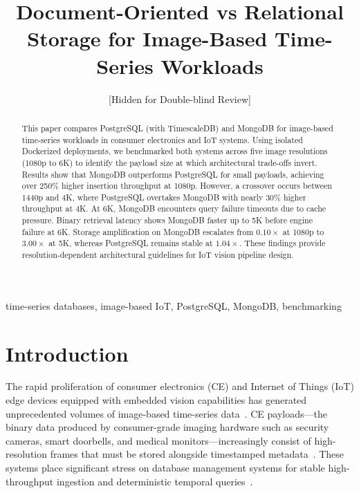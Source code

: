 \documentclass[conference, a4paper]{IEEEtran}
\begin{document}
\title{Document-Oriented vs Relational Storage for Image-Based Time-Series Workloads}

\author{
[Hidden for Double-blind Review]
}


\maketitle

\begin{abstract}
This paper compares PostgreSQL (with TimescaleDB) and MongoDB for image-based time-series workloads in consumer electronics and IoT systems. Using isolated Dockerized deployments, we benchmarked both systems across five image resolutions (1080p to 6K) to identify the payload size at which architectural trade-offs invert. Results show that MongoDB outperforms PostgreSQL for small payloads, achieving over 250\% higher insertion throughput at 1080p. However, a crossover occurs between 1440p and 4K, where PostgreSQL overtakes MongoDB with nearly 30\% higher throughput at 4K. At 6K, MongoDB encounters query failure timeouts due to cache pressure. Binary retrieval latency shows MongoDB faster up to 5K before engine failure at 6K. Storage amplification on MongoDB escalates from $0.10\times$ at 1080p to $3.00\times$ at 5K, whereas PostgreSQL remains stable at $1.04\times$. These findings provide resolution-dependent architectural guidelines for IoT vision pipeline design.
\end{abstract}

\begin{IEEEkeywords}
time-series databases, image-based IoT, PostgreSQL, MongoDB, benchmarking
\end{IEEEkeywords}

\section{Introduction}
\label{sec:introduction} 

The rapid proliferation of consumer electronics (CE) and Internet of Things (IoT) edge devices equipped with embedded vision capabilities has generated unprecedented volumes of image-based time-series data~\cite{ieee_ce_definition}. CE payloads---the binary data produced by consumer-grade imaging hardware such as security cameras, smart doorbells, and medical monitors---increasingly consist of high-resolution frames that must be stored alongside timestamped metadata~\cite{intuz_iot_databases,ceec_tsdb_review}. These systems place significant stress on database management systems for stable high-throughput ingestion and deterministic temporal queries~\cite{jensen_tsms_survey,nerc_tsdb_survey}.
\end{document}
